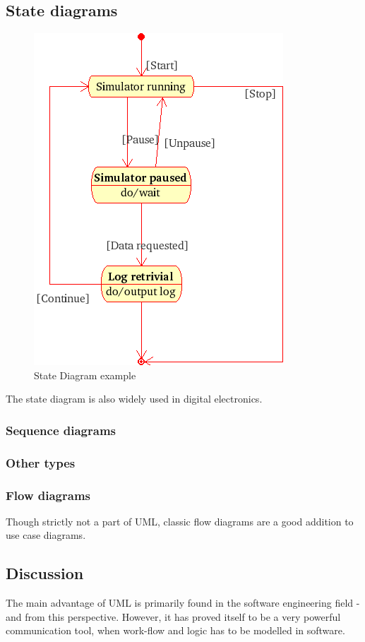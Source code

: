 \documentclass[10pt,a4paper]{article}
\begin{document}
\subsection{State diagrams}
\begin{figure}[h]
\centering
\includegraphics[scale=0.45]{fig/UML_state_diagram.png} 
\caption{State Diagram example}
\label{fig:state_diagram_example}
\end{figure}

The state diagram is also widely used in digital electronics.


\subsubsection{Sequence diagrams}

\subsubsection{Other types}


\subsubsection*{Flow diagrams}
Though strictly not a part of UML, classic flow diagrams are a good addition to use case diagrams.


\subsection{Discussion}
The main advantage of UML is primarily found in the software engineering field - and from this perspective. However, it has proved itself to be a very powerful communication tool, when work-flow and logic has to be modelled in software.
\end{document}
